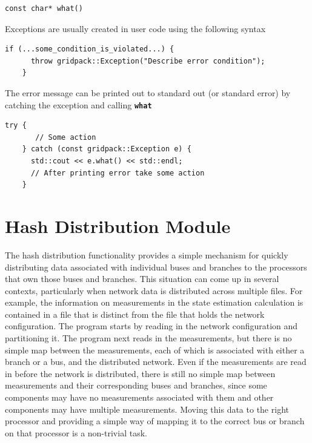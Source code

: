 \documentclass[12pt]{report} %
\begin{document}
{
\color{red}
\begin{Verbatim}[fontseries=b]
const char* what()
\end{Verbatim}
}

Exceptions are usually created in user code using the following syntax

{
\color{red}
\begin{Verbatim}[fontseries=b]
    if (...some_condition_is_violated...) {
      throw gridpack::Exception("Describe error condition");
    }
\end{Verbatim}
}

The error message can be printed out to standard out (or standard error) by catching the exception and calling \texttt{\textbf{what}}

{
\color{red}
\begin{Verbatim}[fontseries=b]
    try {
       // Some action
    } catch (const gridpack::Exception e) {
      std::cout << e.what() << std::endl;
      // After printing error take some action
    }
\end{Verbatim}
}

\section{Hash Distribution Module}

The hash distribution functionality provides a simple mechanism for quickly distributing data associated with individual buses and branches to the processors that own those buses and branches. This situation can come up in several contexts, particularly when network data is distributed across multiple files. For example, the information on measurements in the state estimation calculation is contained in a file that is distinct from the file that holds the network configuration. The program starts by reading in the network configuration and partitioning it. The program next reads in the measurements, but there is no simple map between the measurements, each of which is associated with either a branch or a bus, and the distributed network. Even if the measurements are read in before the network is distributed, there is still no simple map between measurements and their corresponding buses and branches, since some components may have no measurements associated with them and other components may have multiple measurements. Moving this data to the right processor and providing a simple way of mapping it to the correct bus or branch on that processor is a non-trivial task.
\end{document}

